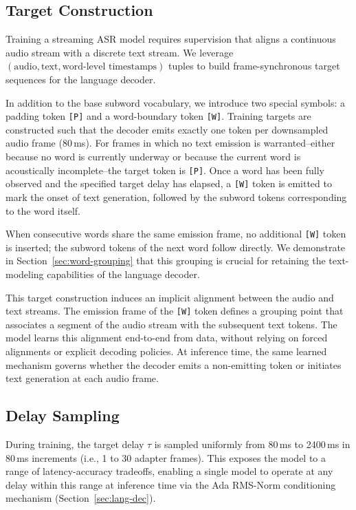 \subsection{Target Construction} \label{sec:target-construction}

Training a streaming ASR model requires supervision that aligns a continuous audio stream with a discrete text stream. We leverage $(\text{audio}, \text{text}, \text{word-level timestamps})$ tuples to build frame-synchronous target sequences for the language decoder.

In addition to the base subword vocabulary, we introduce two special symbols: a padding token \texttt{[P]} and a word-boundary token \texttt{[W]}. Training targets are constructed such that the decoder emits exactly one token per downsampled audio frame (80\,ms). For frames in which no text emission is warranted--either because no word is currently underway or because the current word is acoustically incomplete--the target token is \texttt{[P]}. Once a word has been fully observed and the specified target delay has elapsed, a \texttt{[W]} token is emitted to mark the onset of text generation, followed by the subword tokens corresponding to the word itself.

When consecutive words share the same emission frame, no additional \texttt{[W]} token is inserted; the subword tokens of the next word follow directly. We demonstrate in Section~\ref{sec:word-grouping} that this grouping is crucial for retaining the text-modeling capabilities of the language decoder.

This target construction induces an implicit alignment between the audio and text streams. The emission frame of the \texttt{[W]} token defines a grouping point that associates a segment of the audio stream with the subsequent text tokens. The model learns this alignment end-to-end from data, without relying on forced alignments or explicit decoding policies. At inference time, the same learned mechanism governs whether the decoder emits a non-emitting token or initiates text generation at each audio frame.

\subsection{Delay Sampling}

During training, the target delay $\tau$ is sampled uniformly from 80\,ms to 2400\,ms in 80\,ms increments (i.e., 1 to 30 adapter frames). This exposes the model to a range of latency-accuracy tradeoffs, enabling a single model to operate at any delay within this range at inference time via the Ada RMS-Norm conditioning mechanism (Section~\ref{sec:lang-dec}).

